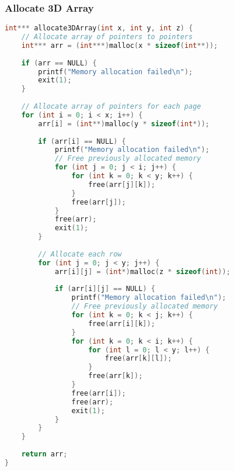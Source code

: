 \documentclass[12pt]{article}
\begin{document}
\subsubsection{Allocate 3D Array}
\begin{lstlisting}[language=C]
int*** allocate3DArray(int x, int y, int z) {
    // Allocate array of pointers to pointers
    int*** arr = (int***)malloc(x * sizeof(int**));
    
    if (arr == NULL) {
        printf("Memory allocation failed\n");
        exit(1);
    }
    
    // Allocate array of pointers for each page
    for (int i = 0; i < x; i++) {
        arr[i] = (int**)malloc(y * sizeof(int*));
        
        if (arr[i] == NULL) {
            printf("Memory allocation failed\n");
            // Free previously allocated memory
            for (int j = 0; j < i; j++) {
                for (int k = 0; k < y; k++) {
                    free(arr[j][k]);
                }
                free(arr[j]);
            }
            free(arr);
            exit(1);
        }
        
        // Allocate each row
        for (int j = 0; j < y; j++) {
            arr[i][j] = (int*)malloc(z * sizeof(int));
            
            if (arr[i][j] == NULL) {
                printf("Memory allocation failed\n");
                // Free previously allocated memory
                for (int k = 0; k < j; k++) {
                    free(arr[i][k]);
                }
                for (int k = 0; k < i; k++) {
                    for (int l = 0; l < y; l++) {
                        free(arr[k][l]);
                    }
                    free(arr[k]);
                }
                free(arr[i]);
                free(arr);
                exit(1);
            }
        }
    }
    
    return arr;
}
\end{lstlisting}
\end{document}
